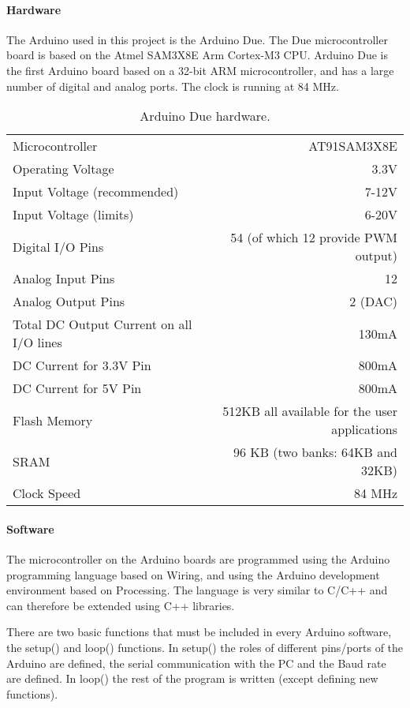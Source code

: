 \documentclass[a4paper,11pt]{article}
\begin{document}
\paragraph{Hardware}
The Arduino used in this project is the Arduino Due. The Due microcontroller board is 
based on the Atmel SAM3X8E Arm Cortex-M3 CPU. Arduino Due is the first Arduino board 
based on a 32-bit ARM microcontroller, and has a large number of digital and analog ports. 
The clock is running at 84 MHz.
\begin{table}
	\caption{Arduino Due hardware.}
	\begin{tabular}{l | r}

		Microcontroller 							&	AT91SAM3X8E \\
		Operating Voltage 							&	3.3V \\
		Input Voltage (recommended)					&	7-12V \\
		Input Voltage (limits)						&	6-20V \\
		Digital I/O Pins 							&	54 (of which 12 provide PWM output) \\
		Analog Input Pins 							&	12 \\
		Analog Output Pins 							&	2 (DAC) \\
		Total DC Output Current on all I/O lines 	&	130mA \\
		DC Current for 3.3V Pin 					&	800mA \\
		DC Current for 5V Pin 						&	800mA \\
		Flash Memory 								&	512KB all available for the user 														applications\\
		SRAM										&	96 KB (two banks: 64KB and 32KB) \\
		Clock Speed 								&	84 MHz \\

	\end{tabular}
\end{table}

\newpage
\paragraph{Software}
The microcontroller on the Arduino boards are programmed using the Arduino programming 
language based on Wiring, and using the Arduino development environment based on Processing.
The language is very similar to C/C++ and can therefore be extended using C++ libraries.

There are two basic functions that must be included in every Arduino software, 
the setup() and loop() functions. In setup() the roles of different pins/ports of the Arduino 
are defined, the serial communication with the PC and the Baud rate are defined. In loop() 
the rest of the program is written (except defining new functions).
\end{document}

